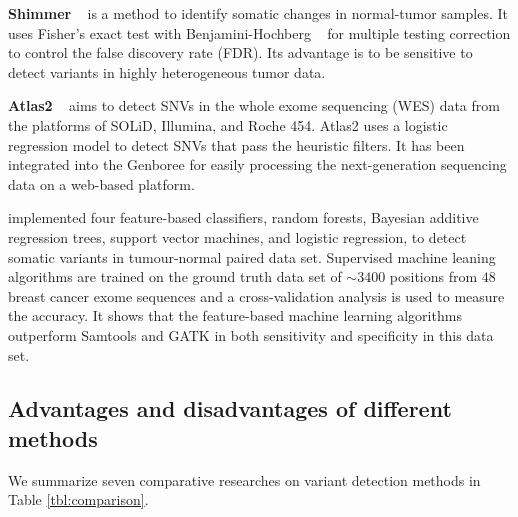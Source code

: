 \documentclass[11pt,reqno]{amsart}
\begin{document}
\textbf{Shimmer} ~\citep{Hansen2013} is a method to identify somatic changes in normal-tumor samples.
It uses Fisher's exact test with Benjamini-Hochberg ~\citep{benjamini1995controlling} for multiple testing correction to control the false discovery rate (FDR).
Its advantage is to be sensitive to detect variants in highly heterogeneous tumor data.

\textbf{Atlas2} ~\citep{challis2012integrative} aims to detect SNVs in the whole exome sequencing (WES) data from the platforms of SOLiD, Illumina, and Roche 454.
Atlas2 uses a logistic regression model to detect SNVs that pass the heuristic filters.
It has been integrated into the Genboree for easily processing the next-generation sequencing data on a web-based platform.


\citet{Ding2012} implemented four feature-based classifiers, random forests, Bayesian additive regression trees, support vector machines, and logistic regression, to detect somatic variants in tumour-normal paired data set.
Supervised machine leaning algorithms are trained on the ground truth data set of $\sim 3400$ positions from $48$ breast cancer exome sequences and a cross-validation analysis is used to measure the accuracy.
It shows that the feature-based machine learning algorithms outperform Samtools and GATK in both sensitivity and specificity in this data set.


\subsection{Advantages and disadvantages of different methods}
We summarize seven comparative researches on variant detection methods in Table \ref{tbl:comparison}.
\end{document}

